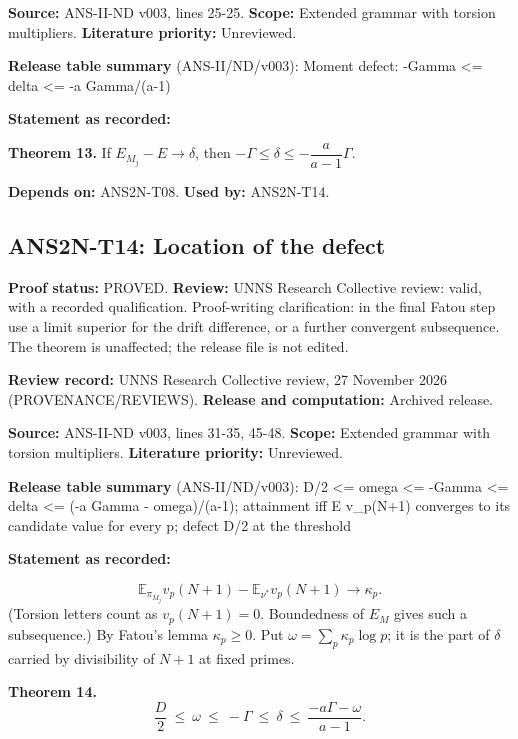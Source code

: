 \documentclass[
  11pt,
]{article}
\begin{document}
\textbf{Source:} ANS-II-ND v003, lines 25-25. \textbf{Scope:} Extended
grammar with torsion multipliers. \textbf{Literature priority:}
Unreviewed.

\textbf{Release table summary} (ANS-II/ND/v003): Moment defect: -Gamma
\textless= delta \textless= -a Gamma/(a-1)

\textbf{Statement as recorded:}

\textbf{Theorem 13.} If \(E_{M_j}-E\to\delta\), then
\(-\Gamma\le\delta\le-\dfrac{a}{a-1}\Gamma\).

\textbf{Depends on:} ANS2N-T08. \textbf{Used by:} ANS2N-T14.

\hypertarget{ans2n-t14-location-of-the-defect}{%
\subsection{ANS2N-T14: Location of the
defect}\label{ans2n-t14-location-of-the-defect}}

\textbf{Proof status:} PROVED. \textbf{Review:} UNNS Research Collective
review: valid, with a recorded qualification. Proof-writing
clarification: in the final Fatou step use a limit superior for the
drift difference, or a further convergent subsequence. The theorem is
unaffected; the release file is not edited.

\textbf{Review record:} UNNS Research Collective review, 27 November
2026 (PROVENANCE/REVIEWS). \textbf{Release and computation:} Archived
release.

\textbf{Source:} ANS-II-ND v003, lines 31-35, 45-48. \textbf{Scope:}
Extended grammar with torsion multipliers. \textbf{Literature priority:}
Unreviewed.

\textbf{Release table summary} (ANS-II/ND/v003): D/2 \textless= omega
\textless= -Gamma \textless= delta \textless= (-a Gamma - omega)/(a-1);
attainment iff E v\_p(N+1) converges to its candidate value for every p;
defect D/2 at the threshold

\textbf{Statement as recorded:}

\[\mathbb E_{\pi_{M_j}}v_p(N+1)-\mathbb E_{\nu^\ast}v_p(N+1)\to\kappa_p .\]
(Torsion letters count as \(v_p(N+1)=0\). Boundedness of \(E_M\) gives
such a subsequence.) By Fatou's lemma \(\kappa_p\ge0\). Put
\(\omega=\sum_p\kappa_p\log p\); it is the part of \(\delta\) carried by
divisibility of \(N+1\) at fixed primes.

\textbf{Theorem 14.}
\[\frac D2\ \le\ \omega\ \le\ -\Gamma\ \le\ \delta\ \le\ \frac{-a\Gamma-\omega}{a-1}.\]
\end{document}
